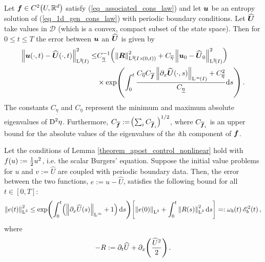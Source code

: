 \documentclass[final]{amsart}
\newcommand{\Coeta}{C_{\overline{\eta}}}
\newcommand{\Cof}{C_{\overline{\vect{f}}}}
\newcommand{\Cofi}{C_{\overline{\vect{f}}_i}}
\newcommand{\Cueta}{C_{\underline{\eta}}}
\newcommand{\recgs}[1]{\widehat{\vec{#1}}}
\renewcommand{\vect}[1]{\geovec{#1}}
\renewcommand{\vec}[1]{\geovec{#1}}
\numberwithin{equation}{section}
\begin{document}
\begin{Lem} \label{theorem_apost_control_nonlinear}Let $\vec{f}\in C^2\qp{U,\mathbb{R}^d}$ satisfy (\ref{eq_associated_cons_law}) and let $\vec{u}$ be an entropy solution of (\ref{eq_1d_gen_cons_law}) with periodic boundary conditions.  Let $\recgs{U}$ take values in $\mathcal{D}$ (which is a convex, compact subset of the state space).  Then for $0\leq t\leq T$ the error between $\vec{u}$ an  $\recgs{U}$ is given by 
\begin{equation}\label{eq_bound}
\begin{aligned}
\Norm{\vect{u}\qp{\cdot,t}-\recgs{U}\qp{\cdot,t}}^2_{\leb{2}\qp{I}}\leq&
\Cueta^{-1}\qp{\Norm{\vect{R}}^2_{\leb{2}\qp{I\times\qp{0,t}}}
  +\Coeta\Norm{\vect{u}_0-\recgs{U}_0}^2_{\leb{2}\qp{I}}}\\ &\times\exp\qp{\int_0^t\frac{\Coeta
    \Cof \Norm{\partial_x\recgs{U}\qp{\cdot,s}}_{\leb{\infty}\qp{I}}
    +\Coeta^2}{\Cueta}\mathrm{d}s}.
\end{aligned}
\end{equation}
The constants $\Cueta$ and $\Coeta$ represent the minimum and maximum absolute eigenvalues of $\mathrm{D}^2 \eta$. Furthermore, $\Cof:=\qp{\sum_i \Cofi}^{1/2}$, where $\Cofi$ is an upper bound for the absolute values of the eigenvalues of the \textit{i}th component of $\vec{f}$.
\end{Lem}

\begin{Cor}
	\label{cor_stab_control_burgers}
	Let the conditions of Lemma
        \ref{theorem_apost_control_nonlinear} hold with
        $f\!\left({u}\right):=\frac{1}{2}u^2$, i.e. the scalar Burgers'
        equation. Suppose the initial value problems for $u$ and
        $v:=\widehat{U}$ are coupled with periodic boundary data.
        Then, the error between the two functions, $e:=
        u-\widehat{U}$, satisfies the following bound for all $t\in
        [0,T]$:
	\begin{equation}\label{eq:burgers_bound}
	\Norm{e\qp{t}}^2_{\leb{2}}\leq \exp\qp{\int_0^t\qp{\Norm{\partial_x\widehat{U}\qp{s}}_{\leb{\infty}}+1}\mathrm{d}s}\qb{\Norm{e\qp{0}}_{\leb{2}}+\int_0^t\Norm{R\qp{s}}^2_{\leb{2}}\mathrm{d}s}=: \w_b\qp{t}\cE_b^2\qp{t},
	\end{equation}
	where 
	\begin{equation}
-R:=\partial_t\widehat{U} +\partial_x\!\left({\frac{\widehat{U}^2}{2}}\right).
	\end{equation}
\end{Cor}
\end{document}

